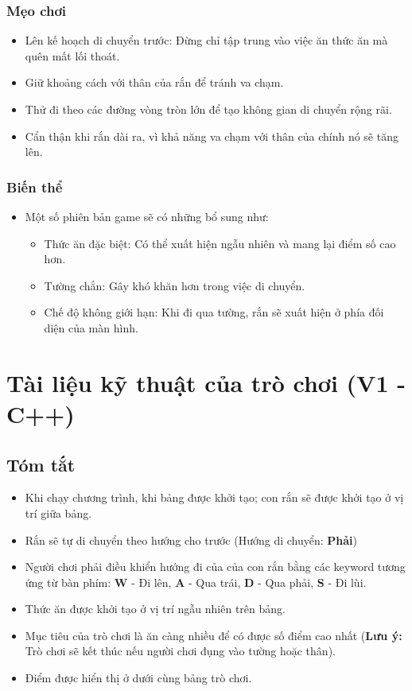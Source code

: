 \documentclass[a4paper, 12pt]{article}
\begin{document}
\subsubsection{Mẹo chơi}
\begin{itemize}
    \item Lên kế hoạch di chuyển trước: Đừng chỉ tập trung vào việc ăn thức ăn mà quên mất lối thoát.
    \item Giữ khoảng cách với thân của rắn để tránh va chạm.
    \item Thử đi theo các đường vòng tròn lớn để tạo không gian di chuyển rộng rãi.
    \item Cẩn thận khi rắn dài ra, vì khả năng va chạm với thân của chính nó sẽ tăng lên.
\end{itemize}

\subsubsection{Biến thể}
\begin{itemize}
    \item Một số phiên bản game sẽ có những bổ sung như:
    \begin{itemize}
        \item Thức ăn đặc biệt: Có thể xuất hiện ngẫu nhiên và mang lại điểm số cao hơn.
        \item Tường chắn: Gây khó khăn hơn trong việc di chuyển.
        \item Chế độ không giới hạn: Khi đi qua tường, rắn sẽ xuất hiện ở phía đối diện của màn hình.
    \end{itemize}
\end{itemize}

\section{Tài liệu kỹ thuật của trò chơi (V1 - C++)}
\subsection{Tóm tắt}
\begin{itemize}
    \item Khi chạy chương trình, khi bảng được khởi tạo; con rắn sẽ được khởi tạo ở vị trí giữa bảng.
    \item Rắn sẽ tự di chuyển theo hướng cho trước (Hướng di chuyển: \textbf{Phải})
    \item Người chơi phải điều khiển hướng đi của của con rắn bằng các keyword tương ứng từ bàn phím: \textbf{W} - Đi lên, \textbf{A} - Qua trái, \textbf{D} - Qua phải, \textbf{S} - Đi lùi.
    \item Thức ăn được khởi tạo ở vị trí ngẫu nhiên trên bảng.
    \item Mục tiêu của trò chơi là ăn càng nhiều để có được số điểm cao nhất (\textbf{Lưu ý:} Trò chơi sẽ kết thúc nếu người chơi đụng vào tường hoặc thân).
    \item Điểm được hiển thị ở dưới cùng bảng trò chơi.
\end{itemize}
\end{document}
